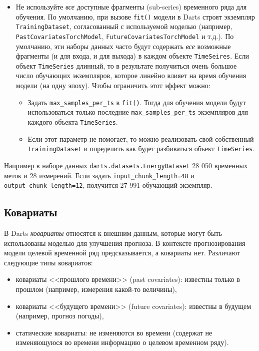 \documentclass[%
	11pt,
	a4paper,
	utf8,
		]{article}
\begin{document}
\begin{itemize}
	\item Не используйте \emph{все} доступные фрагменты (sub-series) временного ряда для обучения. По умолчанию, при вызове \verb|fit()| модели в Darts строят экземпляр \verb|TrainingDataset|, согласованный с используемой моделью (например, \verb|PastCovariatesTorchModel|, \verb|FutureCovariatesTorchModel| и т.д.). По умолчанию, эти наборы данных часто будут содержать \emph{все} возможные фрагменты (и для входа, и для выхода) в каждом объекте \verb|TimeSeires|. Если объект \verb|TimeSeries| длинный, то в результате получиться очень большое число обучающих экземпляров, которое линейно влияет на время обучения модели (на одну эпоху). Чтобы ограничить этот эффект можно:
	\begin{itemize}
		\item Задать \verb|max_samples_per_ts| в \verb|fit()|. Тогда для обучения модели будут использоваться только последние \verb|max_samples_per_ts| экземпляров для каждого объекта \verb|TimeSeries|.
		
		\item Если этот параметр не помогает, то можно реализовать свой собственный \verb|TrainingDataset| и определить как будет разбиваться объект \verb|TimeSeries|. 
	\end{itemize}
\end{itemize}

Например в наборе данных \verb|darts.datasets.EnergyDataset| 28 050 временных меток и 28 измерений. Если задать \verb|input_chunk_length=48| и \verb|output_chunk_length=12|, получится 27 991 обучающий экземпляр.

\subsection{Ковариаты}

В Darts \emph{ковариаты} относятся к внешним данным, которые могут быть использованы моделью для улучшения прогноза. В контексте прогнозирования модели целевой временной ряд предсказывается, а ковариаты нет. Различают следующие типы ковариатов:
\begin{itemize}
	\item ковариаты <<прошлого времени>> (past covariates): известны только в прошлом (например, измерения какой-то величины),
	
	\item ковариаты <<будущего времени>> (future covariates): известны в будущем (например, прогноз погоды),
	
	\item статические ковариаты: не изменяются во времени (содержат не изменяющуюся во времени информацию о целевом временном ряду).
\end{itemize}
\end{document}

